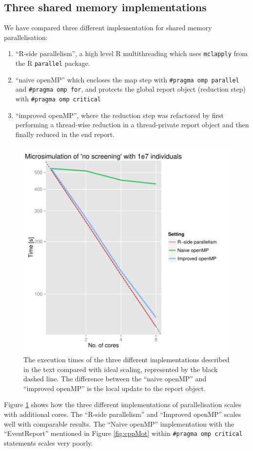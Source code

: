 \subsection{Three shared memory implementations}

We have compared three different implementation for shared memory parallelisation: 
\begin{enumerate}
\item ``R-side parallelism'', a high level R multithreading which uses
  \texttt{mclapply} from the R \texttt{parallel} package.
\item ``naive openMP'' which encloses the map step with \texttt{\#pragma
    omp parallel} and \texttt{\#pragma omp for}, and protects the
  global report object (reduction step) with \texttt{\#pragma omp
    critical}
\item ``improved openMP'', where the reduction step was refactored by
  first performing a thread-wise reduction in a thread-private report
  object and then finally reduced in the end report.
\end{enumerate}
\begin{figure}[!htbp] \centering
  \includegraphics[height=0.5\textheight]{images/implementationProfiling.pdf}
  \caption{The execution times of the three different implementations
    described in the text compared with ideal scaling, represented by
    the black dashed line. The difference between the ``naive openMP''
    and ``improved openMP'' is the local update to the report object.}
  \label{fig:implScaling}
\end{figure} 
Figure \ref{fig:implScaling} shows how the three
different implementations of parallelisation scales with additional
cores. The ``R-side parallelism'' and ``Improved openMP'' scales
well with comparable results. The ``Naive openMP'' implementation
with the ``EventReport'' mentioned in Figure \ref{fig:cppMot} within
\texttt{\#pragma omp critical} statements scales very poorly. 


